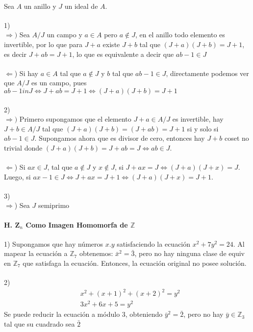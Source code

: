 \documentclass{article}
\begin{document}
\\
Sea $A$ un anillo y $J$ un ideal de $A$.
\\
\\
1)
\\
$\Longrightarrow)$ Sea $A/J$ un campo y $a \in A$ pero $a \notin J$, en el anillo todo elemento es invertible, por lo que para $J+a$ existe $J+b$ tal que $(J+a)(J+b)=J+1$, es decir $J+ab=J+1$, lo que es equivalente a decir que $ab-1 \in J$
\\
\\
$\Longleftarrow$) Si hay $a \in A$ tal que $a \notin J$ y $b$ tal que $ab-1 \in J$, directamente podemos ver que $A/J$ es un campo, pues $ab-1 in J \Longleftrightarrow J+ab=J+1 \Longleftrightarrow (J+a)(J+b)=J+1$
\\
\\
2)
\\
$\Longrightarrow)$ Primero supongamos que el elemento $J+a \in A/J$ es invertible, hay $J+b \in A/J$ tal que $(J+a)(J+b)=(J+ab)=J+1$ si y solo si $ab-1 \in J$. Supongamos ahora que es divisor de cero, entonces hay $J+b$ coset no trivial donde $(J+a)(J+b)=J+ab=J \Longleftrightarrow ab \in J$.
\\
\\
$\Longleftarrow$) Si $ax \in J$, tal que $a \notin J$ y $x \notin J$, si $J+ax = J \Longleftrightarrow (J+a)(J+x)=J$. Luego, si $ax-1 \in J \Longleftrightarrow J+ax = J+1 \Longleftrightarrow (J+a)(J+x)=J+1$.
\\
\\
3)
\\
$\Longrightarrow$) Sea $J$ semiprimo
\\
\\
\textbf{H. $\textbf{Z}_n$ Como Imagen Homomorfa de $\mathbb{Z}$}
\\
\\
1) Supongamos que hay números $x.y$ satisfaciendo la ecuación $x^2 + 7y^2 = 24$. Al mapear la ecuación a $\mathbb{Z}_7$ obtenemos: $\bar{x}^{2}=\bar{3}$, pero no hay ninguna clase de equiv en $\mathbb{Z}_7$ que satisfaga la ecuación. Entonces, la ecuación original no posee solución.
\\
\\
2)
\begin{equation*}
\begin{aligned}
    &x^{2}+(x+1)^2+(x+2)^2 = y^2 \\
    &3x^2 + 6x + 5 = y^{2}
\end{aligned}
\end{equation*}
Se puede reducir la ecuación a módulo $3$, obteniendo $\bar{y}^{2}=\bar{2}$, pero no hay $\bar{y} \in \mathbb{Z}_3$ tal que su cuadrado sea $\bar{2}$
\end{document}
